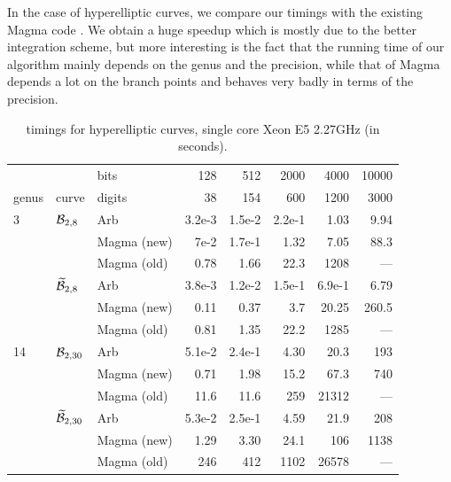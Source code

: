 \documentclass[main.tex]{subfiles}
\begin{document}
  In the case of hyperelliptic curves, we compare our timings with the existing
  Magma code \cite{vanWamelen06}. We obtain a huge speedup which is mostly due
  to the better integration scheme, but more interesting is the fact that the
  running time of our algorithm mainly depends on the genus and the precision,
  while that of Magma depends a lot on the branch points and behaves very badly
  in terms of the precision.

  \begin{table}[H]
      \begin{center}
          \begin{tabular}{lllrrrrr}
              \toprule
              & & \hfill bits & 128 & 512 & 2000 & 4000 & 10000 \\
              genus & curve & \hfill digits & 38 & 154 & 600 & 1200 & 3000 \\
              \midrule
              3 & $\mathcal{B}_{2,8}$
              & Arb   & 3.2e-3 & 1.5e-2 & 2.2e-1 & 1.03 & 9.94 \\
              & & Magma (new) & 7e-2 & 1.7e-1 & 1.32 & 7.05 & 88.3 \\
              & & Magma (old) & 0.78 & 1.66 & 22.3 & 1208 & --- \\
              \cmidrule{3-8}
              & $\widetilde{\mathcal{B}}_{2,8}$
              & Arb & 3.8e-3 & 1.2e-2 & 1.5e-1 & 6.9e-1 & 6.79 \\
              & & Magma (new) & 0.11 & 0.37 & 3.7 & 20.25 & 260.5 \\
              & & Magma (old) & 0.81 & 1.35 & 22.2 & 1285 & --- \\
              \midrule
              14 & $\mathcal{B}_{2,30}$
              & Arb & 5.1e-2 & 2.4e-1 & 4.30 & 20.3 & 193 \\
              & & Magma (new) & 0.71 & 1.98 & 15.2 & 67.3 & 740 \\
              & & Magma (old) & 11.6 & 11.6 & 259 & 21312 & --- \\
              \cmidrule{3-8}
              & $\widetilde{\mathcal{B}}_{2,30}$
              & Arb & 5.3e-2 & 2.5e-1 & 4.59 & 21.9 & 208 \\
              & & Magma (new) & 1.29 & 3.30 & 24.1 & 106 & 1138 \\
              & & Magma (old) & 246 & 412 & 1102 & 26578 & --- \\
              \bottomrule
          \end{tabular}
          \caption{timings for hyperelliptic curves, single core Xeon E5 2.27GHz (in seconds).}
      \end{center}
  \end{table}

  \biblio
  
\end{document}
